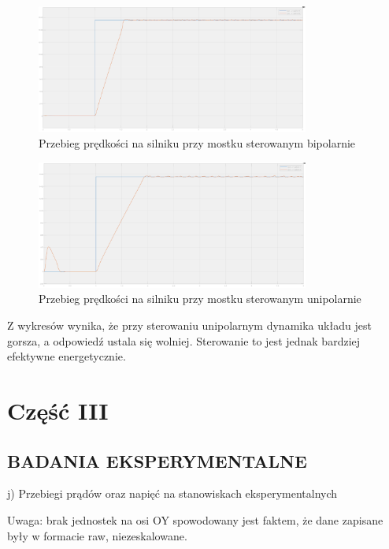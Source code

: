 \documentclass[11pt]{article}
\begin{document}
\begin{figure}[H]
\centering
\includegraphics[width=0.8\textwidth]{aun1_bipolar_bridge2.png}
\caption{Przebieg prędkości na silniku przy mostku sterowanym bipolarnie}
\end{figure}

\begin{figure}[H]
\centering
\includegraphics[width=0.8\textwidth]{aun1_unipolar_bridge2.png}
\caption{Przebieg prędkości na silniku przy mostku sterowanym unipolarnie}
\end{figure}

Z wykresów wynika, że przy sterowaniu unipolarnym dynamika układu jest gorsza, a odpowiedź ustala się wolniej. Sterowanie to jest jednak bardziej efektywne energetycznie.\\

\section{Część III}

\subsection{BADANIA EKSPERYMENTALNE}

j) Przebiegi prądów oraz napięć na stanowiskach eksperymentalnych

Uwaga: brak jednostek na osi OY spowodowany jest faktem, że dane
zapisane były w formacie raw, niezeskalowane.\\
\end{document}
